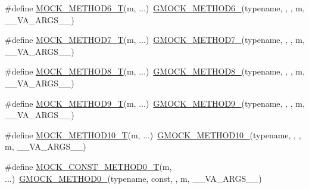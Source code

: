 \begin{DoxyCompactItemize}
\#define \mbox{\hyperlink{googletest-master_2googlemock_2include_2gmock_2gmock-generated-function-mockers_8h_a0d16357a0043d36b167a1c42ef33f672}{M\+O\+C\+K\+\_\+\+M\+E\+T\+H\+O\+D6\+\_\+T}}(m, ...)~\mbox{\hyperlink{_obj__test_2lib_2googletest-release-1_88_81_2googlemock_2include_2gmock_2gmock-generated-function-mockers_8h_ad0ca7f6973a076d0af4c953f8ed91842}{G\+M\+O\+C\+K\+\_\+\+M\+E\+T\+H\+O\+D6\+\_\+}}(typename, , , m, \+\_\+\+\_\+\+V\+A\+\_\+\+A\+R\+G\+S\+\_\+\+\_\+)
\item 
\#define \mbox{\hyperlink{googletest-master_2googlemock_2include_2gmock_2gmock-generated-function-mockers_8h_a31bdd1d1448052f4122ecebf937a8f44}{M\+O\+C\+K\+\_\+\+M\+E\+T\+H\+O\+D7\+\_\+T}}(m, ...)~\mbox{\hyperlink{_obj__test_2lib_2googletest-release-1_88_81_2googlemock_2include_2gmock_2gmock-generated-function-mockers_8h_ab98a8399ba62b53b375c2807f4d39d2f}{G\+M\+O\+C\+K\+\_\+\+M\+E\+T\+H\+O\+D7\+\_\+}}(typename, , , m, \+\_\+\+\_\+\+V\+A\+\_\+\+A\+R\+G\+S\+\_\+\+\_\+)
\item 
\#define \mbox{\hyperlink{googletest-master_2googlemock_2include_2gmock_2gmock-generated-function-mockers_8h_aa7e6573bb6a57f2a2d3c2875caeffaa3}{M\+O\+C\+K\+\_\+\+M\+E\+T\+H\+O\+D8\+\_\+T}}(m, ...)~\mbox{\hyperlink{_obj__test_2lib_2googletest-release-1_88_81_2googlemock_2include_2gmock_2gmock-generated-function-mockers_8h_aa84a36427c44505207b7cad5dec7ad67}{G\+M\+O\+C\+K\+\_\+\+M\+E\+T\+H\+O\+D8\+\_\+}}(typename, , , m, \+\_\+\+\_\+\+V\+A\+\_\+\+A\+R\+G\+S\+\_\+\+\_\+)
\item 
\#define \mbox{\hyperlink{googletest-master_2googlemock_2include_2gmock_2gmock-generated-function-mockers_8h_a838c68cbdf422cfc703b83daf1d1f1e1}{M\+O\+C\+K\+\_\+\+M\+E\+T\+H\+O\+D9\+\_\+T}}(m, ...)~\mbox{\hyperlink{_obj__test_2lib_2googletest-release-1_88_81_2googlemock_2include_2gmock_2gmock-generated-function-mockers_8h_aa820171a19cc587c247dbe05cbffc55f}{G\+M\+O\+C\+K\+\_\+\+M\+E\+T\+H\+O\+D9\+\_\+}}(typename, , , m, \+\_\+\+\_\+\+V\+A\+\_\+\+A\+R\+G\+S\+\_\+\+\_\+)
\item 
\#define \mbox{\hyperlink{googletest-master_2googlemock_2include_2gmock_2gmock-generated-function-mockers_8h_aa28723ba52933b5ea9a4ffa1a73d15e1}{M\+O\+C\+K\+\_\+\+M\+E\+T\+H\+O\+D10\+\_\+T}}(m, ...)~\mbox{\hyperlink{_obj__test_2lib_2googletest-release-1_88_81_2googlemock_2include_2gmock_2gmock-generated-function-mockers_8h_a81a48223a8771de36ef92ac6d56f6e81}{G\+M\+O\+C\+K\+\_\+\+M\+E\+T\+H\+O\+D10\+\_\+}}(typename, , , m, \+\_\+\+\_\+\+V\+A\+\_\+\+A\+R\+G\+S\+\_\+\+\_\+)
\item 
\#define \mbox{\hyperlink{googletest-master_2googlemock_2include_2gmock_2gmock-generated-function-mockers_8h_a5fc82f3de9d5e83b0a6bb6cda98a8887}{M\+O\+C\+K\+\_\+\+C\+O\+N\+S\+T\+\_\+\+M\+E\+T\+H\+O\+D0\+\_\+T}}(m, ...)~\mbox{\hyperlink{_obj__test_2lib_2googletest-release-1_88_81_2googlemock_2include_2gmock_2gmock-generated-function-mockers_8h_ae0d290ffa58d7c624b2e3487ba1252f4}{G\+M\+O\+C\+K\+\_\+\+M\+E\+T\+H\+O\+D0\+\_\+}}(typename, const, , m, \+\_\+\+\_\+\+V\+A\+\_\+\+A\+R\+G\+S\+\_\+\+\_\+)

\end{DoxyCompactItemize}
